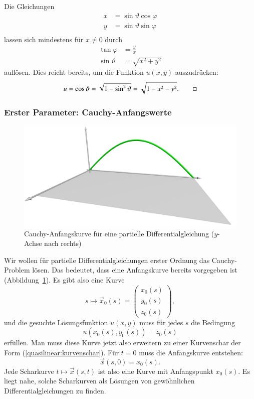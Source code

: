 \begin{beispiel}
Die Gleichungen
\begin{align*}
x&=\sin\vartheta\cos\varphi\\
y&=\sin\vartheta\sin\varphi\\
\end{align*}
lassen sich mindestens für $x\ne 0$ durch
\begin{align*}
\tan\varphi&=\frac{y}{x}\\
\sin\vartheta &=\sqrt{x^2+y^2}
\end{align*}
auflösen. Dies reicht bereits, um die Funktion $u(x,y)$
auszudrücken:
\[
u=\cos\vartheta=\sqrt{1-\sin^2\vartheta}=\sqrt{1-x^2-y^2}.
\qedhere
\]
\end{beispiel}

\subsubsection{Erster Parameter: Cauchy-Anfangswerte}
\begin{figure}
\begin{center}
\includegraphics[width=\hsize]{3d/cauchy.jpg}
\end{center}
\caption{Cauchy-Anfangskurve für eine partielle Differentialgleichung
($y$-Achse nach rechts)
\label{geometrie:cauchy-anfangskurve}}
\end{figure}
Wir wollen für partielle Differentialgleichungen erster Ordnung
das Cauchy-Problem lösen.
Das bedeutet, dass eine Anfangskurve bereits vorgegeben ist
(Abbildung~\ref{geometrie:cauchy-anfangskurve}).
Es gibt also eine Kurve
\begin{equation}
s\mapsto\vec x_0(s)=\begin{pmatrix}
x_0(s)\\
y_0(s)\\
z_0(s)
\end{pmatrix},
\label{quasilinear:anfangskurve}
\end{equation}
und die gesuchte Lösungsfunktion $u(x,y)$ muss für jedes $s$ die
Bedingung
\[
u(x_0(s), y_0(s))=z_0(s)
\]
erfüllen.
Man muss diese Kurve jetzt also erweitern zu einer Kurvenschar
der Form (\ref{quasilinear:kurvenschar}).
Für $t=0$ muss die Anfangskurve entstehen:
\[
\vec x(s,0)=x_0(s).
\]
Jede Scharkurve $t\mapsto \vec x(s,t)$ ist also eine Kurve
mit Anfangspunkt $x_0(s)$.
Es liegt nahe, solche Scharkurven als Lösungen von gewöhnlichen
Differentialgleichungen zu finden.

